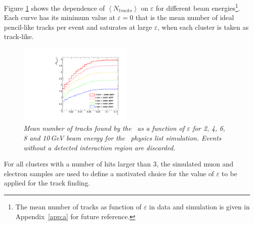 Figure \ref{fig:epsilonsys} shows the dependence of $\left<N_{tracks}\right>$ on $\varepsilon$ for different beam energies\footnote{\label{note3}The mean number of tracks as function of $\varepsilon$ in data and simulation is given in Appendix~\ref{app:a} for future reference.}.
Each curve has its minimum value at $\varepsilon = 0$ that is the mean number of ideal pencil-like tracks per event and saturates at large $\varepsilon$, when each cluster is taken as track-like.  
\begin{figure}
	\centering
	\includegraphics[width=0.5\textwidth]{ECAL/plots/comparison.pdf}
	\caption{\label{fig:epsilonsys} \sl Mean number of tracks found by the \tfa\ as a function of $\varepsilon$ for 2, 4, 6, 8 and 10\,GeV beam energy for the \qgsp\ physics list simulation. Events without a detected interaction region are discarded.}
\end{figure}

For all clusters with a number of hits larger than 3, the simulated muon and electron samples are used to define a motivated choice for the value of  $\varepsilon$ to be applied for the track finding. 

